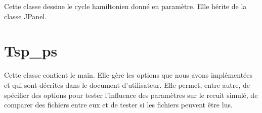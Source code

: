 \documentclass{article}
\begin{document}
Cette classe dessine le cycle hamiltonien donné en paramètre. Elle hérite de la classe JPanel.

\section{Tsp_ps}

Cette classe contient le main. Elle gère les options que nous avons implémentées et qui sont décrites dans le document d'utilisateur. Elle permet, entre autre, de spécifier des options pour tester l'influence des paramètres sur le recuit simulé, de comparer des fichiers entre eux et de tester si les fichiers peuvent être lus.
\end{document}
